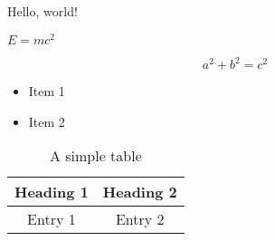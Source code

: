 

Hello, world!

$E=mc^2$

\begin{equation}
a^2 + b^2 = c^2
\end{equation}

\begin{itemize}
    \item Item 1
    \item Item 2
\end{itemize}

\begin{table}[h]
    \centering
    \begin{tabular}{c | c}
        Heading 1 & Heading 2 \\
        \hline
        Entry 1 & Entry 2 \\
    \end{tabular}
    \caption{A simple table}
\end{table}

